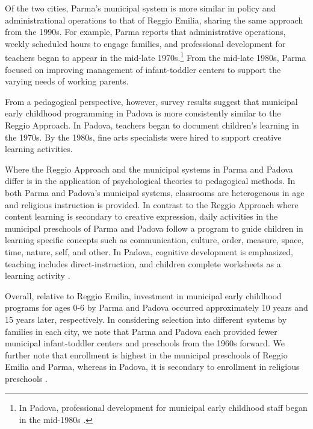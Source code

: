 Of the two cities, Parma's municipal system is more similar in policy and administrational operations to that of Reggio Emilia, sharing the same approach from the 1990s. For example, Parma reports that administrative operations, weekly scheduled hours to engage families, and professional development for teachers began to appear in the mid-late 1970s.\footnote{In Padova, professional development for municipal early childhood staff began in the mid-1980s \citep{Becchi-Ferrari_1990_Pub-Inf-Centres-Italy}.} From the mid-late 1980s, Parma focused on improving management of infant-toddler centers to support the varying needs of working parents. 

From a pedagogical perspective, however, survey results suggest that municipal early childhood programming in Padova is more consistently similar  to the Reggio Approach. In Padova, teachers began to document children's learning in the 1970s. By the 1980s, fine arts specialists were hired to support creative learning activities. 

Where the Reggio Approach and the municipal systems in Parma and Padova differ is in the application of psychological theories to pedagogical methods. In both Parma and Padova's municipal systems, classrooms are heterogenous in age and religious instruction is provided. In contrast to the Reggio Approach where content learning is secondary to creative expression, daily activities in the municipal preschools of Parma and Padova follow a program to guide children in learning specific concepts such as communication, culture, order, measure, space, time, nature, self, and other. In Padova, cognitive development is emphasized, teaching includes direct-instruction, and children complete worksheets as a learning activity \citep{CEHD_2016_Historical-Analysis}. 

Overall, relative to Reggio Emilia, investment in municipal early childhood programs for ages 0-6 by Parma and Padova occurred approximately 10 years and 15 years later, respectively. In considering selection into different systems by families in each city, we note that Parma and Padova each provided fewer municipal infant-toddler centers and preschools from the 1960s forward. We further note that enrollment is highest in the municipal preschools of Reggio Emilia and Parma, whereas in Padova, it is secondary to enrollment in religious preschools \citep{Padova-Admin-Data_1964-2011,Reggio-Admin-data_1966-2006,Reggio-Annual-Journals_1994-2011}. 

